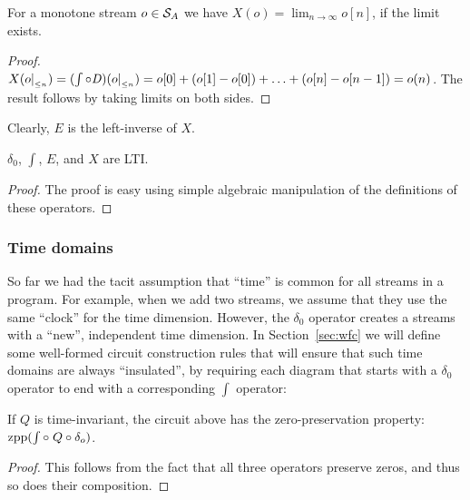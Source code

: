 \begin{proposition}
For a monotone stream $o \in \mathcal{S}_{A}$ we have
$X(o) = \lim_{n \to \infty} o[n]$, if the limit exists.
\end{proposition}
\begin{proof}
$X(o|_{_{\leq n}}) = (\int \circ \mathit{D})(o|_{_{\leq n}}) = o[0] + (o[1] - o[0]) + \ldots + (o[n] - o[n-1]) = o(n)$.
The result follows by taking limits on both sides.
\end{proof}

Clearly, $E$ is the left-inverse of $X$.

\begin{proposition}
$\delta_0$, $\int$, $E$, and $X$ are LTI.
\end{proposition}
\begin{proof}
The proof is easy using simple algebraic manipulation of the definitions of these operators.
\end{proof}

\subsubsection{Time domains}\label{sec:time-domains}

So far we had the tacit assumption that ``time'' is common for all
streams in a program.  For example, when we add two streams,
we assume that they use the same ``clock'' for the time dimension.
However, the $\delta_0$ operator creates a streams with a ``new'', independent time
dimension.  In Section~\ref{sec:wfc} we will define some well-formed circuit
construction rules that will ensure that such time domains are always ``insulated'',
by requiring each diagram that starts with a $\delta_0$ operator
to end with a corresponding $\int$ operator:

\begin{center}
\end{center}


\begin{proposition}
If $Q$ is time-invariant, the circuit above has the zero-preservation
property: $\mbox{zpp}(\int \circ\; Q \circ \delta_o)$.
\end{proposition}
\begin{proof}
  This follows from the fact that all three operators preserve zeros, and thus so
  does their composition.
\end{proof}

